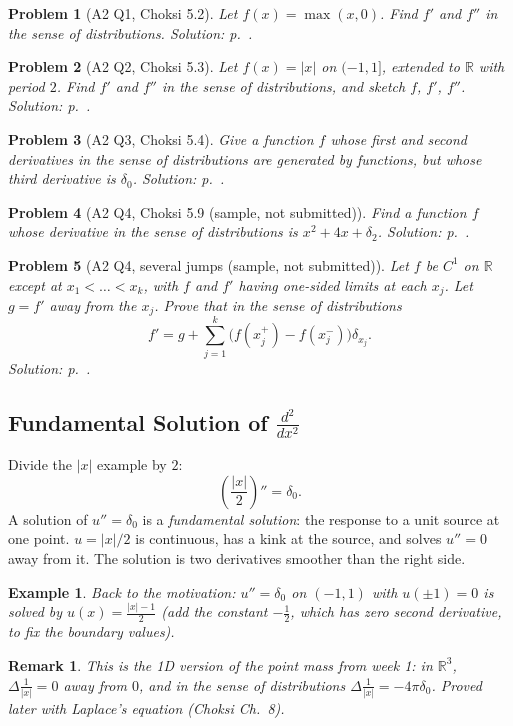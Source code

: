 \documentclass{article}
\newtheorem{problem}{Problem}
\newtheorem*{example}{Example}
\newtheorem{remark}{Remark}
\newcommand{\R}{\mathbb{R}}
\begin{document}
\begin{problem}[A2 Q1, Choksi 5.2]\label{prob:a2-52}
    Let $f(x) = \max(x,0)$. Find $f'$ and $f''$ in the sense of distributions.
    \hfill \emph{Solution: p.~\pageref{sol:a2-52}.}
\end{problem}
\begin{problem}[A2 Q2, Choksi 5.3]\label{prob:a2-53}
    Let $f(x) = |x|$ on $(-1,1]$, extended to $\R$ with period $2$. Find $f'$ and $f''$ in the sense of distributions, and sketch $f$, $f'$, $f''$.
    \hfill \emph{Solution: p.~\pageref{sol:a2-53}.}
\end{problem}
\begin{problem}[A2 Q3, Choksi 5.4]\label{prob:a2-54}
    Give a function $f$ whose first and second derivatives in the sense of distributions are generated by functions, but whose third derivative is $\delta_0$.
    \hfill \emph{Solution: p.~\pageref{sol:a2-54}.}
\end{problem}
\begin{problem}[A2 Q4, Choksi 5.9 (sample, not submitted)]\label{prob:a2-59}
    Find a function $f$ whose derivative in the sense of distributions is $x^2 + 4x + \delta_2$.
    \hfill \emph{Solution: p.~\pageref{sol:a2-59}.}
\end{problem}
\begin{problem}[A2 Q4, several jumps (sample, not submitted)]\label{prob:a2-jumps}
    Let $f$ be $C^1$ on $\R$ except at $x_1 < \dots < x_k$, with $f$ and $f'$ having one-sided limits at each $x_j$. Let $g = f'$ away from the $x_j$. Prove that in the sense of distributions
    \begin{equation*}
        f' = g + \sum_{j=1}^k\big(f(x_j^+) - f(x_j^-)\big)\delta_{x_j}.
    \end{equation*}
    \hfill \emph{Solution: p.~\pageref{sol:a2-jumps}.}
\end{problem}

\subsection{Fundamental Solution of $\frac{d^2}{dx^2}$}
Divide the $|x|$ example by $2$:
\begin{equation}
    \left(\frac{|x|}{2}\right)'' = \delta_0 .
\end{equation}
A solution of $u'' = \delta_0$ is a \emph{fundamental solution}: the response to a unit source at one point. $u = |x|/2$ is continuous, has a kink at the source, and solves $u'' = 0$ away from it. The solution is two derivatives smoother than the right side.
\begin{example}
    Back to the motivation: $u'' = \delta_0$ on $(-1,1)$ with $u(\pm 1) = 0$ is solved by $u(x) = \frac{|x| - 1}{2}$ (add the constant $-\tfrac12$, which has zero second derivative, to fix the boundary values).
\end{example}
\begin{remark}
    This is the 1D version of the point mass from week 1: in $\R^3$, $\Delta\frac{1}{|x|} = 0$ away from $0$, and in the sense of distributions $\Delta\frac{1}{|x|} = -4\pi\delta_0$. Proved later with Laplace's equation (Choksi Ch.~8).
\end{remark}
\end{document}
